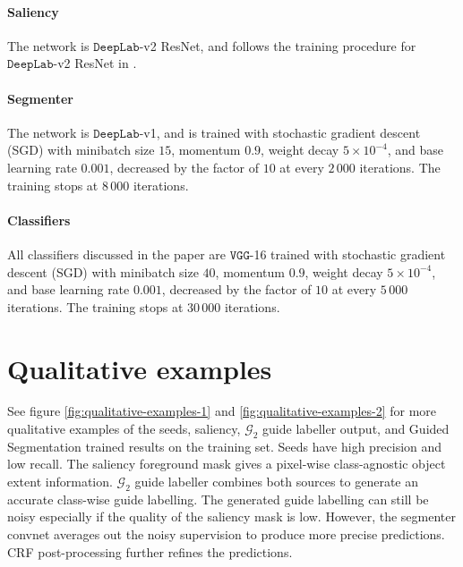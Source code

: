 \documentclass[british,10pt,twocolumn,letterpaper]{article}
\begin{document}
\paragraph{Saliency}

The network is $\mathtt{DeepLab}$-v2 ResNet, and follows the training
procedure for $\mathtt{DeepLab}$-v2 ResNet in \cite{Chen2016ArxivDeeplabv2}. 

\paragraph{Segmenter}

The network is $\mathtt{DeepLab}$-v1, and is trained with stochastic
gradient descent (SGD) with minibatch size $15$, momentum $0.9$,
weight decay $5\times10^{-4}$, and base learning rate $0.001$, decreased
by the factor of $10$ at every $2\,000$ iterations. The training
stops at $8\,000$ iterations. 

\paragraph{Classifiers}

All classifiers discussed in the paper are $\mathtt{VGG}$-16 trained
with stochastic gradient descent (SGD) with minibatch size $40$,
momentum $0.9$, weight decay $5\times10^{-4}$, and base learning
rate $0.001$, decreased by the factor of $10$ at every $5\,000$
iterations. The training stops at $30\,000$ iterations. 

\section{\label{sec:supp-qualitative}Qualitative examples}

See figure \ref{fig:qualitative-examples-1} and \ref{fig:qualitative-examples-2}
for more qualitative examples of the seeds, saliency, $\mathcal{G}_{2}$
guide labeller output, and Guided Segmentation trained results on
the training set. Seeds have high precision and low recall. The saliency
foreground mask gives a pixel-wise class-agnostic object extent information.
$\mathcal{G}_{2}$ guide labeller combines both sources to generate
an accurate class-wise guide labelling. The generated guide labelling
can still be noisy especially if the quality of the saliency mask
is low. However, the segmenter convnet averages out the noisy supervision
to produce more precise predictions. CRF post-processing further refines
the predictions.
\end{document}

